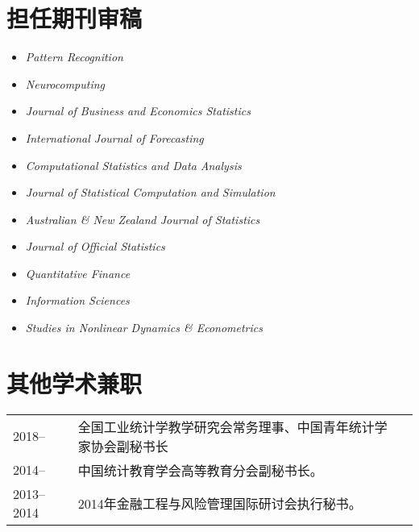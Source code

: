 \documentclass[twoside,a4paper,10pt]{amsart}
\begin{document}
\section*{担任期刊审稿}
\begin{itemize}
\item \emph{Pattern Recognition}
\item \emph{Neurocomputing}
\item  \emph{Journal of Business and Economics Statistics}
\item  \emph{International Journal of Forecasting}
\item  \emph{Computational Statistics and Data Analysis}
\item  \emph{Journal of Statistical Computation and Simulation}
\item  \emph{Australian \& New Zealand Journal of Statistics}
\item  \emph{Journal of Official Statistics}
\item  \emph{Quantitative Finance}
\item  \emph{Information Sciences}
\item  \emph{Studies in Nonlinear Dynamics \& Econometrics}
\end{itemize}

\section*{其他学术兼职}
\begin{tabular}{l p{} l}
  2018--     & 全国工业统计学教学研究会常务理事、中国青年统计学家协会副秘书长 \\
  2014--     & 中国统计教育学会高等教育分会副秘书长。                         \\
  2013--2014 & 2014年金融工程与风险管理国际研讨会执行秘书。                   \\

\end{tabular}


\end{document}
